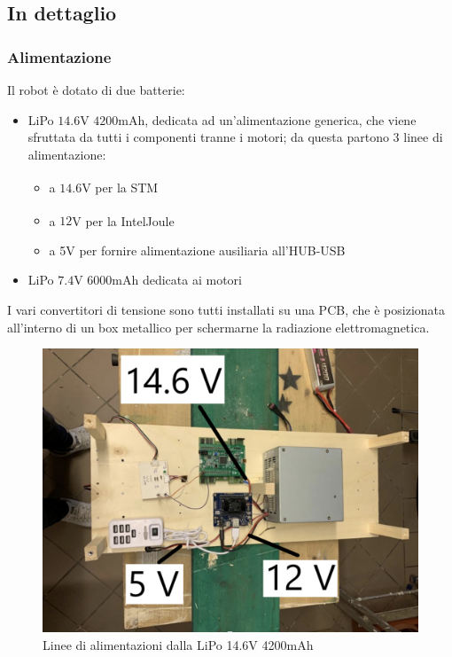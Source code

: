 \subsection{In dettaglio}
\label{subsection1.1.1}

\subsubsection*{Alimentazione}
\label{subsubsection1.1.1.1}

Il robot è dotato di due batterie:
\begin{itemize}
    \item LiPo $14.6$V $4200$mAh, dedicata ad un’alimentazione generica, che viene sfruttata da tutti i componenti tranne i motori; da questa partono 3 linee di alimentazione: 
    \begin{itemize}
        \item a $14.6$V per la STM\textsuperscript\textregistered
        \item a $12$V per la Intel\textsuperscript\textregistered Joule\texttrademark
        \item a 5V per fornire alimentazione ausiliaria all’HUB-USB
    \end{itemize}
    \item LiPo $7.4$V $6000$mAh dedicata ai motori
\end{itemize}

I vari convertitori di tensione sono tutti installati su una PCB, che è posizionata all’interno di un box metallico per schermarne la radiazione elettromagnetica.

\bigskip

\begin{figure}[h] 
\centering    
\includegraphics[scale=0.3]{Capitolo1/Figs/batteria.png}
\caption[Alimentazione]{Linee di alimentazioni dalla LiPo 14.6V 4200mAh}
\label{fig:alimentazione}
\end{figure}

